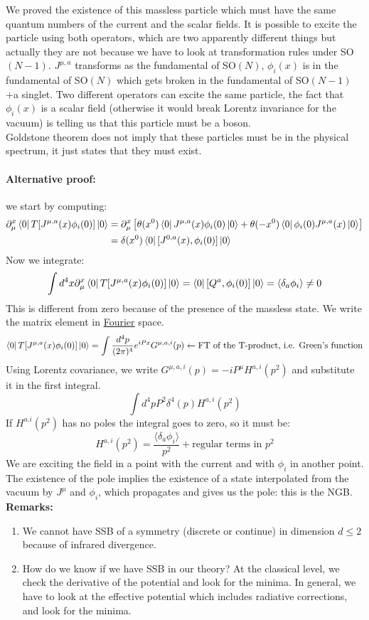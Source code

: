 \documentclass[../main.tex]{subfiles}
\begin{document}
We proved the existence of this massless particle which must have the same quantum numbers of the current and the scalar fields. It is possible to excite the particle using both operators, which are two apparently different things but actually they are not because we have to look at transformation rules under SO$(N-1)$. $J^{\mu,a}$ transforms as the fundamental of SO$(N)$, $\phi_i(x)$ is in the fundamental of SO$(N)$ which gets broken in the fundamental of SO$(N-1)$+a singlet. Two different operators can excite the same particle, the fact that $\phi_i(x)$ is a scalar field (otherwise it would break Lorentz invariance for the vacuum) is telling us that this particle must be a boson. \\
Goldstone theorem does not imply that these particles must be in the physical spectrum, it just states that they must exist.
\paragraph{Alternative proof:}
we start by computing:
\begin{align*}
\partial_\mu^x\bra{0}T[J^{\mu,a}(x)\phi_i(0)]\ket{0}&=\partial_\mu^x\left[\theta(x^0)\bra{0}J^{\mu,a}(x)\phi_i(0)\ket{0}+\theta(-x^0)\bra{0}\phi_i(0)J^{\mu,a}(x)\ket{0}\right]\\
&=\delta(x^0)\bra{0}[J^{0,a}(x),\phi_i(0)]\ket{0}
\end{align*}
Now we integrate:
\[
\int d^4x\partial_\mu^x\bra{0}T[J^{\mu,a}(x)\phi_i(0)]\ket{0}=\bra{0}[Q^a,\phi_i(0)]\ket{0}=\langle\delta_a\phi_i\rangle\neq0
\]
This is different from zero because of the presence of the massless state. We write the matrix element in \href{https://en.wikipedia.org/wiki/Joseph_Fourier}{Fourier} space.
\[
\bra{0}T[J^{\mu,a}(x)\phi_i(0)]\ket{0}=\int\frac{d^4p}{(2\pi)^4}e^{iPx}G^{\mu,a,i}(p)\xleftarrow[]{}\text{FT of the T-product, i.e. Green's function}
\]
Using Lorentz covariance, we write $G^{\mu,a,i}(p)=-iP^\mu H^{a,i}(p^2)$ and substitute it in the first integral.
\[
\int d^4pP^2\delta^4(p)H^{a,i}(p^2)
\]
If $H^{a.i}(p^2)$ has no poles the integral goes to zero, so it must be:
\[
H^{a,i}(p^2)=\frac{\langle\delta_a\phi_i\rangle}{p^2}+\text{regular terms in $p^2$}
\]
We are exciting the field in a point with the current and with $\phi_i$ in another point. The existence of the pole implies the existence of a state interpolated from the vacuum by $J^\mu$ and $\phi_i$, which propagates and gives us the pole: this is the NGB.\\

\textbf{Remarks:}
\begin{enumerate}
    \item We cannot have SSB of a symmetry (discrete or continue) in dimension $d\le2$ because of infrared divergence.
    \item How do we know if we have SSB in our theory? At the classical level, we check the derivative of the potential and look for the minima. In general, we have to look at the effective potential which includes radiative corrections, and look for the minima.
\end{enumerate}
\end{document}
